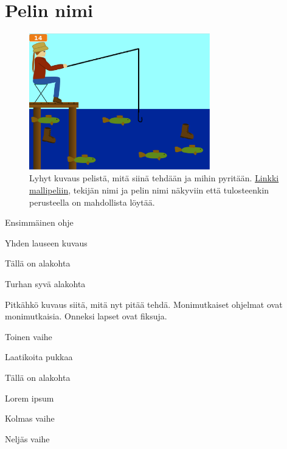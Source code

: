 \documentclass[12pt,twoside]{article}
\begin{document}
\selectfont
\section*{Pelin nimi}

\begin{figure}
  \centering
  \captionsetup{labelformat=empty}
  \caption{Lyhyt kuvaus pelistä, mitä siinä tehdään ja mihin pyritään. \href{https://google.fi}{Linkki mallipeliin}, tekijän nimi ja pelin nimi näkyviin että tulosteenkin perusteella on mahdollista löytää.}
  \includegraphics[width=0.7\textwidth]{kuvat/esimerkki.png}
\end{figure}

\begin{vaihetaso1}
	\item Ensimmäinen ohje
	\begin{vaihetaso2}
		\item Yhden lauseen kuvaus
		\item Tällä on alakohta
		\begin{vaihetaso3}
			\item Turhan syvä alakohta
		\end{vaihetaso3}
		\item Pitkähkö kuvaus siitä, mitä nyt pitää tehdä. Monimutkaiset ohjelmat ovat monimutkaisia. Onneksi lapset ovat fiksuja.
	\end{vaihetaso2}
	\item Toinen vaihe
	\begin{vaihetaso2}
		\item Laatikoita pukkaa
		\item Tällä on alakohta
		\item Lorem ipsum
	\end{vaihetaso2}
	\item Kolmas vaihe
	\item Neljäs vaihe
\end{vaihetaso1}
\end{document}
